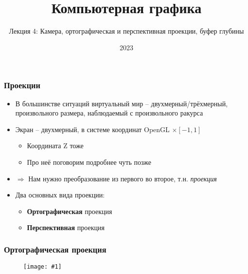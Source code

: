 \documentclass[10pt]{beamer}
\title{Компьютерная графика}
\subtitle{Лекция 4: Камера, ортографическая и перспективная проекции, буфер глубины}
\date{2023}
\newcommand{\slideimage}[1]{
  \begin{figure}
    \begin{adjustbox}{width=\textwidth, totalheight=\textheight-2\baselineskip-2\baselineskip,keepaspectratio}
      \texttt{[image: \#1]}
    \end{adjustbox}
  \end{figure}
}
\begin{document}
\frame{\titlepage}

\begin{frame}[fragile]
\frametitle{Проекции}
\begin{itemize}
\item В большинстве ситуаций виртуальный мир -- двухмерный/трёхмерный, произвольного размера, наблюдаемый с произвольного ракурса
\pause
\item Экран -- двухмерный, в системе координат OpenGL \begin{math}[-1, 1] \times [-1, 1]\end{math}
\pause
\begin{itemize}
\item Координата Z тоже \begin{math}[-1, 1]\end{math}
\item Про неё поговорим подробнее чуть позже
\end{itemize}
\pause
\item \begin{math}\Longrightarrow\end{math} Нам нужно преобразование из первого во второе, т.н. \textit{проекция}
\pause
\item Два основных вида проекции:
\begin{itemize}
\item \textbf{Ортографическая} проекция
\item \textbf{Перспективная} проекция
\end{itemize}
\end{itemize}
\end{frame}

\begin{frame}[fragile]
\frametitle{Ортографическая проекция}
\slideimage{orthographic.png}
\end{frame}
\end{document}
